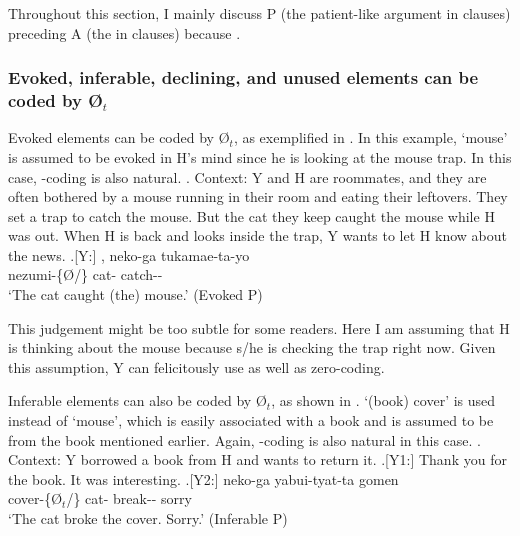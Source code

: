 Throughout this section,
I mainly discuss P (the patient-like argument in  clauses) preceding A (the  in  clauses)
because .


\subsubsection{Evoked, inferable, declining, and unused elements can be coded by {\O$_{t}$}}

Evoked elements can be coded by {\O$_{t}$},
as exemplified in \Next. In this example, `mouse' is assumed to be evoked in H's mind since he is looking at the mouse trap.
In this case, -coding is also natural.
%
\ex. Context: Y and H are roommates,
		and they are often bothered by a mouse running in their room
		and eating their leftovers.
	They set a trap to catch the mouse.
	But the cat they keep caught the mouse while H was out.
	When H is back and looks inside the trap,
	Y wants to let H know about the news.
	\ag.[Y:] , neko-ga tukamae-ta-yo \\
		nezumi-\{{\O}/\} cat- catch-- \\
		`The cat caught (the) mouse.' \hfill{(Evoked  P)}

This judgement might be too subtle for some readers.
Here I am assuming that H is thinking about the mouse because s/he is checking the trap right now.
Given this assumption, Y can felicitously use  as well as zero-coding.

Inferable elements can also be coded by {\O$_{t}$},
as shown in \Next.
 `(book) cover' is used instead of  `mouse',
which is easily associated with a book and is assumed to be  from the book mentioned earlier.
Again, -coding is also natural in this case.
%
\ex. Context: Y borrowed a book from H and wants to return it.
 \a.[Y1:] Thank you for the book. It was interesting.
 \bg.[Y2:]  neko-ga yabui-tyat-ta gomen \\
   cover-\{{\O$_{t}$}/\} cat- break-- sorry \\
   `The cat broke the cover. Sorry.' \hfill{(Inferable  P)}

